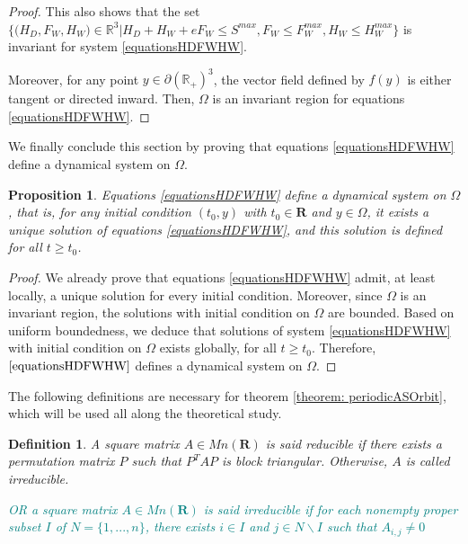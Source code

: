 \documentclass{article}
\newcommand{\marc}[1]{\textcolor{teal}{#1}}
\newtheorem{prop}{Proposition}
\newtheorem{definition}{Definition}
\begin{document}
\begin{proof}
This also shows that the set  $\Big\{\Big(H_D, F_W, H_W \Big) \in \mathbb{R}^3  \Big|H_D + H_W + eF_W \leq S^{max}, F_W \leq F_W^{max}, H_W \leq H_W^{max} \Big\}$ is invariant for system \eqref{equationsHDFWHW}. 


Moreover, for any point $y \in \partial (\mathbb{R}_+)^3$, the vector field defined by $f(y)$ is either tangent or directed inward. Then, $\Omega$ is an invariant region for equations \eqref{equationsHDFWHW}. 

\end{proof}


We finally conclude this section by proving that equations \eqref{equationsHDFWHW} define a dynamical system on $\Omega$.

\begin{prop}
Equations \eqref{equationsHDFWHW} define a dynamical system on $\Omega$, that is, for any initial condition $(t_0, y)$ with $t_0 \in \mathbf{R}$ and $y \in \Omega$, it exists a unique solution of equations \eqref{equationsHDFWHW}, and this solution is defined for all $t \geq t_0$.
\end{prop}

\begin{proof}
We already prove that equations \eqref{equationsHDFWHW} admit, at least locally, a unique solution for every initial condition. Moreover, since $\Omega$ is an invariant region, the solutions with initial condition on $\Omega$ are bounded. Based on uniform boundedness, we deduce that solutions of system \eqref{equationsHDFWHW} with initial condition on $\Omega$ exists globally, for all $t\geq t_0$. Therefore, $\eqref{equationsHDFWHW}$ defines a dynamical system on $\Omega$.
\end{proof}

The following definitions are necessary for theorem \ref{theorem: periodicASOrbit}, which will be used all along the theoretical study.

\begin{definition}\cite{kaszkurewicz_matrix_2012}
A square matrix $A \in Mn (\mathbf{R})$ is said reducible if there exists a permutation matrix $P$ such that $P^ T AP$ is block triangular. Otherwise, $A$ is called irreducible.

\marc{OR a square matrix $A \in Mn (\mathbf{R})$ is said irreducible if for each nonempty proper subset $I$ of $N = \{1, ..., n\}$, there exists $i \in I$ and $j \in N\backslash I$ such that $A_{i,j} \neq 0$}
\end{definition}
\end{document}
